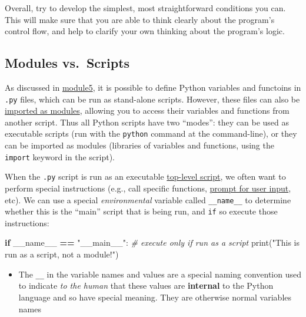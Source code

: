 \documentclass[]{book}
\newenvironment{Shaded}{\begin{snugshade}}{\end{snugshade}}
\newcommand{\StringTok}[1]{\textcolor[rgb]{0.31,0.60,0.02}{#1}}
\newcommand{\CommentTok}[1]{\textcolor[rgb]{0.56,0.35,0.01}{\textit{#1}}}
\newcommand{\VariableTok}[1]{\textcolor[rgb]{0.00,0.00,0.00}{#1}}
\newcommand{\ControlFlowTok}[1]{\textcolor[rgb]{0.13,0.29,0.53}{\textbf{#1}}}
\newcommand{\OperatorTok}[1]{\textcolor[rgb]{0.81,0.36,0.00}{\textbf{#1}}}
\newcommand{\BuiltInTok}[1]{#1}
\newcommand{\NormalTok}[1]{#1}
\providecommand{\tightlist}{%
  \setlength{\itemsep}{0pt}\setlength{\parskip}{0pt}}
\begin{document}
Overall, try to develop the simplest, most straightforward conditions
you can. This will make sure that you are able to think clearly about
the program's control flow, and help to clarify your own thinking about
the program's logic.

\subsection{Modules vs.~Scripts}\label{modules-vs.scripts}

As discussed in \href{../../module5-python-basics}{module5}, it is
possible to define Python variables and functoins in \texttt{.py} files,
which can be run as stand-alone scripts. However, these files can also
be \href{https://docs.python.org/3/tutorial/modules.html}{imported as
modules}, allowing you to access their variables and functions from
another script. Thus all Python scripts have two ``modes'': they can be
used as executable scripts (run with the \texttt{python} command at the
command-line), or they can be imported as modules (libraries of
variables and functions, using the \texttt{import} keyword in the
script).

When the \texttt{.py} script is run as an executable
\href{https://docs.python.org/3/library/__main__.html}{top-level
script}, we often want to perform special instructions (e.g., call
specific functions,
\href{https://docs.python.org/3/library/functions.html\#input}{prompt
for user input}, etc). We can use a special \emph{environmental}
variable called \texttt{\_\_name\_\_} to determine whether this is the
``main'' script that is being run, and \texttt{if} so execute those
instructions:

\begin{Shaded}
\begin{Highlighting}[]
\ControlFlowTok{if} \VariableTok{__name__} \OperatorTok{==} \StringTok{"__main__"}\NormalTok{:}
    \CommentTok{# execute only if run as a script}
    \BuiltInTok{print}\NormalTok{(}\StringTok{"This is run as a script, not a module!"}\NormalTok{)}
\end{Highlighting}
\end{Shaded}

\begin{itemize}
\tightlist
\item
  The \texttt{\_\_} in the variable names and values are a special
  naming convention used to indicate \emph{to the human} that these
  values are \textbf{internal} to the Python language and so have
  special meaning. They are otherwise normal variables names
\end{itemize}
\end{document}
